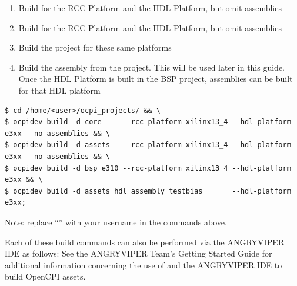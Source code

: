 \begin{flushleft}
\begin{enumerate}
	\item Build  for the  RCC Platform and the  HDL Platform, but omit assemblies
	\item Build  for the  RCC Platform and the  HDL Platform, but omit assemblies
	\item Build the  project for these same platforms
	\item Build the  assembly from the  project. This will be used later in this guide.
		\subitem Once the HDL Platform is built in the BSP project, assemblies can be built for that HDL platform
\end{enumerate}
\begin{lstlisting}[showspaces=false]
$ cd /home/<user>/ocpi_projects/ && \
$ ocpidev build -d core     --rcc-platform xilinx13_4 --hdl-platform e3xx --no-assemblies && \
$ ocpidev build -d assets   --rcc-platform xilinx13_4 --hdl-platform e3xx --no-assemblies && \
$ ocpidev build -d bsp_e310 --rcc-platform xilinx13_4 --hdl-platform e3xx && \
$ ocpidev build -d assets hdl assembly testbias       --hdl-platform e3xx;
\end{lstlisting}
Note: replace ``\code{<user>}'' with your username in the commands above.\\\medskip

Each of these build commands can also be performed via the ANGRYVIPER IDE as follows:
\OcpidevBuild
See the ANGRYVIPER Team's Getting Started Guide for additional information concerning the use of  and the ANGRYVIPER IDE to build OpenCPI assets.


\end{flushleft}
